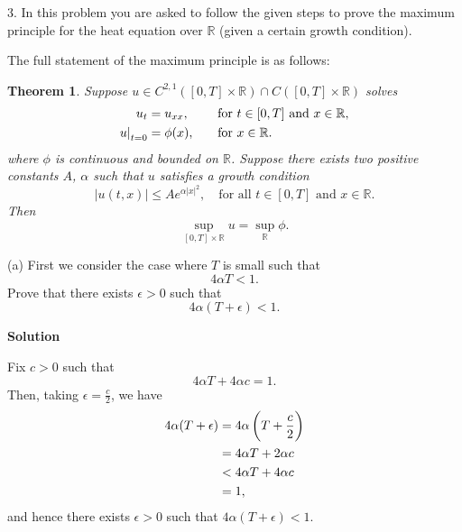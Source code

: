 \documentclass{article}
\newtheorem{theorem}{Theorem}
\begin{document}
\newpage

3. In this problem you are asked to follow the given steps to prove the
maximum principle for the heat equation over $\mathbb{R}$ (given a
certain growth condition).

The full statement of the maximum principle is as follows:
%
\begin{theorem}
    Suppose
    $u \in C^{2, 1} ([0, T] \times \mathbb{R}) \cap C([0, T] \times \mathbb{R})$
    solves
    \begin{alignat*}{2}
        u_t &= u_{xx}, &&\quad\text{for } t \in [0, T] \text{ and } x \in \mathbb{R}, \\
        \eval[0]{u}_{t = 0} &= \phi(x), &&\quad\text{for } x \in \mathbb{R}.
    \end{alignat*}
    where $\phi$ is continuous and bounded on $\mathbb{R}$. Suppose
    there exists two positive constants $A$, $\alpha$ such that $u$
    satisfies a growth condition
    \begin{equation*}
        |u(t, x)| \leq A e^{\alpha |x|^2},
        \quad \text{for all } t \in [0, T] \text{ and } x \in \mathbb{R}
        .
    \end{equation*}
    Then
    \begin{equation}
        \sup_{[0, T] \times \mathbb{R}} u = \sup_{\mathbb{R}} \phi
        .
        \label{eq:2-1}
    \end{equation}
\end{theorem}
%
(a) First we consider the case where $T$ is small such that
%
\begin{equation}
    4 \alpha T < 1
    .
    \label{eq:2-2}
\end{equation}
%
Prove that there exists $\epsilon > 0$ such that
%
\begin{equation*}
    4 \alpha (T + \epsilon) < 1
    .
\end{equation*}

\textbf{Solution}

Fix $c > 0$ such that
%
\begin{equation*}
    4 \alpha T + 4 \alpha c = 1
    .
\end{equation*}
%
Then, taking $\epsilon = \frac{c}{2}$, we have
%
\begin{align*}
    4 \alpha (T + \epsilon)
        &= 4 \alpha \del{T + \frac{c}{2}} \\
        &= 4 \alpha T + 2 \alpha c \\
        &< 4 \alpha T + 4 \alpha c \\
        &= 1
    ,
\end{align*}
%
and hence there exists $\epsilon > 0$ such that
$4 \alpha (T + \epsilon) < 1$.
\end{document}
